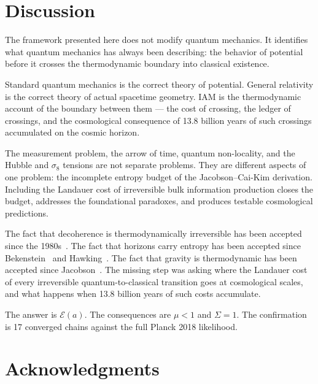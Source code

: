 \documentclass[12pt,a4paper]{article}
\begin{document}
\section{Discussion}
\label{sec:discussion}

The framework presented here does not modify quantum mechanics. It
identifies what quantum mechanics has always been describing: the
behavior of potential before it crosses the thermodynamic boundary into
classical existence.

Standard quantum mechanics is the correct theory of potential. General
relativity is the correct theory of actual spacetime geometry. IAM is
the thermodynamic account of the boundary between them --- the cost of
crossing, the ledger of crossings, and the cosmological consequence of
13.8 billion years of such crossings accumulated on the cosmic horizon.

The measurement problem, the arrow of time, quantum non-locality, and
the Hubble and $\sigma_8$ tensions are not separate problems. They are
different aspects of one problem: the incomplete entropy budget of the
Jacobson--Cai-Kim derivation. Including the Landauer cost of
irreversible bulk information production closes the budget, addresses
the foundational paradoxes, and produces testable cosmological
predictions.

The fact that decoherence is thermodynamically irreversible has been
accepted since the 1980s~\citep{JoosZeh1985,Zurek1981}. The fact that
horizons carry entropy has been accepted since
Bekenstein~\citep{Bekenstein1973} and Hawking~\citep{Hawking1975}. The
fact that gravity is thermodynamic has been accepted since
Jacobson~\citep{Jacobson1995}. The missing step was asking where the
Landauer cost of every irreversible quantum-to-classical transition
goes at cosmological scales, and what happens when 13.8 billion years
of such costs accumulate.

The answer is $\mathcal{E}(a)$. The consequences are $\mu < 1$ and
$\Sigma = 1$. The confirmation is 17 converged chains against the full
Planck 2018 likelihood.

\section*{Acknowledgments}
\end{document}
